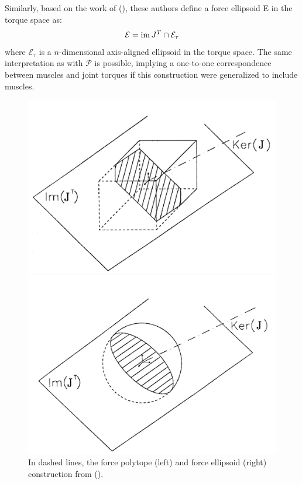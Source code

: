 Similarly, based on the work of (\cite{yoshikawaManipulabilityRoboticMechanisms1985}), these authors define a force ellipsoid E in the torque space as:
\begin{align*}
    \mathcal{E} = \operatorname{im}{J^T} \cap \mathcal{E}_{\tau}
\end{align*}
where $\mathcal{E}_{\tau}$ is a $n$-dimensional axis-aligned ellipsoid in the torque space. The same interpretation as with $\mathcal{P}$ is possible, implying a one-to-one correspondence between muscles and joint torques if this construction were generalized to include muscles.
\begin{figure}[!htb]
    \captionsetup{justification=centering}
    \begin{minipage}{0.48\linewidth}
        \centering
        \includegraphics[trim={0 0 0 0}, clip, width=1\linewidth]{img/chapter_1/chiaccho_pol.png}
    \end{minipage}
    \hfill
    \begin{minipage}{0.48\linewidth}
        \centering
        \includegraphics[trim={0 0 0 0}, clip, width=1\linewidth]{img/chapter_1/chiaccho_elli.png}
    \end{minipage}
    \caption{In dashed lines, the force polytope (left) and force ellipsoid (right) construction from (\cite{chiacchioForcePolytopeForce1997}).}
    \label{fig:chiacchio_pol_ell}
\end{figure}

